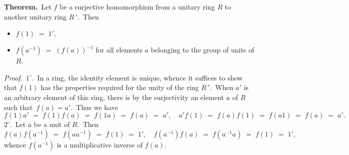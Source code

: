 \documentclass[12pt]{article}
\theoremstyle{definition}
\begin{document}
\textbf{Theorem.}\, Let $f$ be a surjective homomorphism from a unitary ring $R$ to another unitary ring $R\,'$.\, Then
\begin{itemize}
\item $f(1) \;=\; 1',$
\item $f(a^{-1}) \;=\; (f(a))^{-1}$\; for all elements $a$ belonging to the group of units of $R$.
\end{itemize}



\emph{Proof.}\, $1^\circ$.\, In a ring, the  identity element is unique, whence it suffices to show that $f(1)$ has the properties required for the unity of the ring $R\,'$.\, When $a'$ is an arbitrary element of this ring, there is by the surjectivity an element $a$ of $R$ such that\, $f(a) = a'$.\, Thus we have
$$f(1)a' \;=\; f(1)f(a) \;=\; f(1a) \;=\; f(a) \;=\; a', \quad 
  a'f(1) \;=\; f(a)f(1) \;=\; f(a1) \;=\; f(a) \;=\; a'.$$
$2^\circ$.\, Let $a$ be a unit of $R$.\, Then
$$f(a)f(a^{-1}) \;=\; f(aa^{-1}) \;=\; f(1) \;=\; 1', \quad f(a^{-1})f(a) \;=\; f(a^{-1}a) \;=\; f(1) \;=\; 1',$$
whence $f(a^{-1})$ is a multiplicative inverse of $f(a)$.

\end{document}
